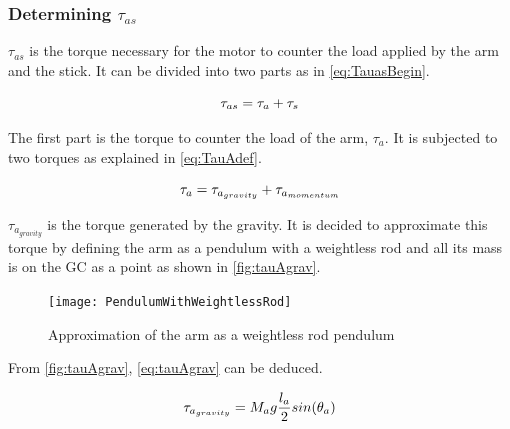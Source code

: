 \subsubsection*{Determining $\tau_{as}$}

$\tau_{as}$ is the torque necessary for the motor to counter the load applied by the arm and the stick. It can be divided into two parts as in \autoref{eq:TauasBegin}.

\begin{equation}\label{eq:TauasBegin}
	\tau_{as}=\tau_a+\tau_s \addunit{\newton\meter}
\end{equation}
\startexplain
{}
\stopexplain

The first part is the torque to counter the load of the arm, $\tau_a$. It is subjected to two torques as explained in \autoref{eq:TauAdef}.

\begin{equation}\label{eq:TauAdef}
	\tau_a=\tau_{a_{gravity}}+\tau_{a_{momentum}} \addunit{\newton\meter}
\end{equation}

 $\tau_{a_{gravity}}$ is the torque generated by the gravity. It is decided to approximate this torque by defining the arm as a pendulum with a weightless rod and all its mass is on the GC as a point as shown in \autoref{fig:tauAgrav}.
 
 \begin{figure}[htbp]
 	\centering
 	\texttt{[image: PendulumWithWeightlessRod]}
 	\caption{Approximation of the arm as a weightless rod pendulum}\label{fig:tauAgrav}
 \end{figure}
 \startexplain
 \stopexplain
 
 From \autoref{fig:tauAgrav}, \autoref{eq:tauAgrav} can be deduced.

\begin{equation}\label{eq:tauAgrav}
	\tau_{a_{gravity}}=M_a g \frac{l_a}{2} sin(\theta_a) \addunit{\newton\meter}
\end{equation}
\startexplain
{}
\stopexplain

